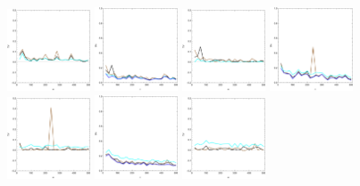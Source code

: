 \documentclass[
twoside,
openright,
titlepage,
numbers=noenddot,
headinclude,%
footinclude=true,
dottedtoc, %
ngerman,
american, %
pagesize=pdftex,
]{book}
\begin{document}
\begin{example}
\begin{figure}[H]
			\includegraphics[width=0.22\textwidth]{figures/1DTVexamples/e3l2}
			\includegraphics[width=0.22\textwidth]{figures/1DTVexamples/e3sn1}
			\includegraphics[width=0.22\textwidth]{figures/1DTVexamples/e3sn2}
			\includegraphics[width=0.22\textwidth]{figures/1DTVexamples/e3n+l1}
			\includegraphics[width=0.22\textwidth]{figures/1DTVexamples/e3n+l2}
			\includegraphics[width=0.22\textwidth]{figures/1DTVexamples/e3sn+t1}
			\includegraphics[width=0.22\textwidth]{figures/1DTVexamples/e3sn+t2}

\end{figure}
\end{example}
\end{document}
